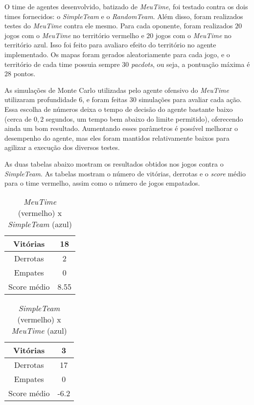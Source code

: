 \documentclass[a4paper,12pt]{article}
\begin{document}
O time de agentes desenvolvido, batizado de \textit{MeuTime}, foi testado contra os dois
times fornecidos: o \textit{SimpleTeam} e o \textit{RandomTeam}. Além disso, foram
realizados testes do \textit{MeuTime} contra ele mesmo. Para cada oponente, foram realizados
$20$ jogos com o \textit{MeuTime} no território vermelho e $20$ jogos com o \textit{MeuTime}
no território azul. Isso foi feito para avaliaro efeito do território no agente implementado.
Os mapas foram gerados aleatoriamente para cada jogo, e o território de cada time
possuia sempre $30$ \textit{pacdots}, ou seja, a pontuação máxima é $28$ pontos.

As simulações de Monte Carlo utilizadas pelo agente ofensivo do \textit{MeuTime} utilizaram
profundidade $6$, e foram feitas $30$ simulações para avaliar cada ação. Essa escolha de números
deixa o tempo de decisão do agente bastante baixo (cerca de $0,2$ segundos, um tempo bem abaixo
do limite permitido), oferecendo ainda um bom resultado. Aumentando esses parâmetros é
possível melhorar o desempenho do agente, mas eles foram mantidos relativamente baixos
para agilizar a execução dos diversos testes.

As duas tabelas abaixo mostram os resultados obtidos nos jogos contra o \textit{SimpleTeam}.
As tabelas mostram o número de vitórias, derrotas e o \textit{score} médio para o time vermelho,
assim como o número de jogos empatados.

\begin{table}[htb!]
    {\centering
    \begin{tabular}{|c|c|} \hline
    Vitórias     & 18   \\ \hline
    Derrotas     & 2    \\ \hline
    Empates      & 0    \\ \hline
    Score médio  & 8.55 \\ \hline
    \end{tabular}
    \caption{\textit{MeuTime} (vermelho) x \textit{SimpleTeam} (azul)}
    }
\end{table}

\begin{table}[htb!]
    {\centering
    \begin{tabular}{|c|c|} \hline
    Vitórias     & 3    \\ \hline
    Derrotas     & 17   \\ \hline
    Empates      & 0    \\ \hline
    Score médio  & -6.2 \\ \hline
    \end{tabular}
    \caption{\textit{SimpleTeam} (vermelho) x \textit{MeuTime} (azul)}
    }
\end{table}
\end{document}
